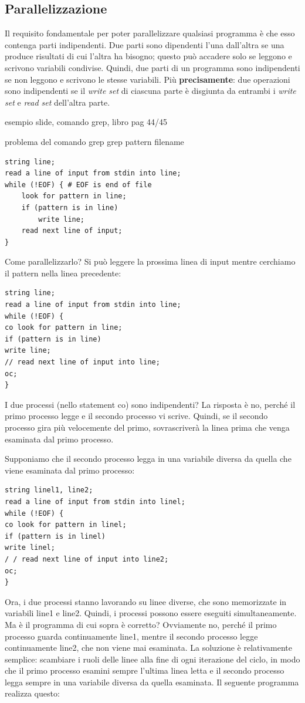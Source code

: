 \documentclass[10pt,a4paper]{article}
\begin{document}
\subsection{Parallelizzazione}
Il requisito fondamentale per poter parallelizzare qualsiasi programma è che esso contenga parti indipendenti. Due parti sono dipendenti l'una dall'altra se una produce risultati di cui l'altra ha bisogno; questo può accadere solo se leggono e scrivono variabili condivise.
Quindi, due parti di un programma sono indipendenti se non leggono e scrivono le stesse variabili.
Più \textbf{precisamente}: due operazioni sono indipendenti se il \textit{write set} di ciascuna parte è disgiunta da entrambi i \textit{write set} e \textit{read set} dell'altra parte.

esempio slide, comando grep, libro pag 44/45

problema del comando grep
grep pattern filename

\begin{verbatim}
string line;
read a line of input from stdin into line;
while (!EOF) { # EOF is end of file
	look for pattern in line;
	if (pattern is in line)
		write line;
	read next line of input;
}
\end{verbatim}

Come parallelizzarlo?
Si può leggere la prossima linea di input mentre cerchiamo il pattern nella linea precedente:

\begin{verbatim}
string line;
read a line of input from stdin into line;
while (!EOF) {
co look for pattern in line;
if (pattern is in line)
write line;
// read next line of input into line;
oc;
}
\end{verbatim}

I due processi (nello statement co) sono indipendenti? La risposta è no, perché il primo processo legge e il secondo processo vi scrive. Quindi, se il secondo processo gira più velocemente del primo, sovrascriverà la linea prima che venga esaminata dal primo processo.

Supponiamo che il secondo processo legga in una variabile diversa da quella che viene esaminata dal primo processo:
\begin{verbatim}
string linel1, line2;
read a line of input from stdin into linel;
while (!EOF) {
co look for pattern in linel;
if (pattern is in linel)
write linel;
/ / read next line of input into line2;
oc;
}
\end{verbatim}

Ora, i due processi stanno lavorando su linee diverse, che sono memorizzate in variabili line1 e line2. Quindi, i processi possono essere eseguiti simultaneamente. Ma è il programma di cui sopra è corretto? Ovviamente no, perché il primo processo guarda continuamente line1, mentre il secondo processo legge continuamente line2, che non viene mai esaminata.
La soluzione è relativamente semplice: scambiare i ruoli delle linee alla fine di ogni iterazione del ciclo, in modo che il primo processo esamini sempre l'ultima linea letta e il secondo processo legga sempre in una variabile diversa da quella esaminata. Il seguente programma realizza questo:
\end{document}
